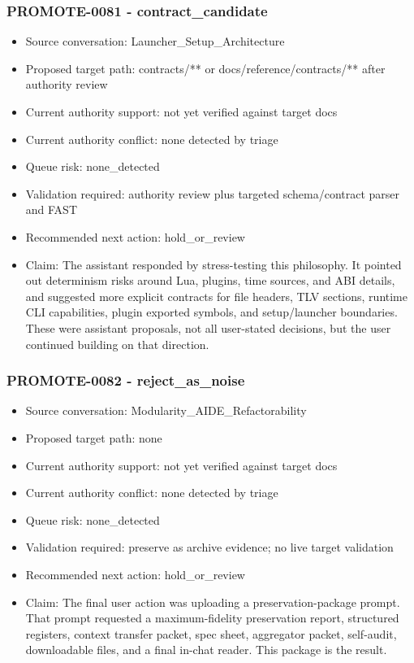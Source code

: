 \documentclass[11pt,a4paper]{report}
\begin{document}
\subsubsection{PROMOTE-0081 - contract\_candidate}

\begin{itemize}
\item Source conversation: Launcher\_Setup\_Architecture
\item Proposed target path: contracts/** or docs/reference/contracts/** after authority review
\item Current authority support: not yet verified against target docs
\item Current authority conflict: none detected by triage
\item Queue risk: none\_detected
\item Validation required: authority review plus targeted schema/contract parser and FAST
\item Recommended next action: hold\_or\_review
\item Claim: The assistant responded by stress-testing this philosophy. It pointed out determinism risks around Lua, plugins, time sources, and ABI details, and suggested more explicit contracts for file headers, TLV sections, runtime CLI capabilities, plugin exported symbols, and setup/launcher boundaries. These were assistant proposals, not all user-stated decisions, but the user continued building on that direction.
\end{itemize}

\subsubsection{PROMOTE-0082 - reject\_as\_noise}

\begin{itemize}
\item Source conversation: Modularity\_AIDE\_Refactorability
\item Proposed target path: none
\item Current authority support: not yet verified against target docs
\item Current authority conflict: none detected by triage
\item Queue risk: none\_detected
\item Validation required: preserve as archive evidence; no live target validation
\item Recommended next action: hold\_or\_review
\item Claim: The final user action was uploading a preservation-package prompt. That prompt requested a maximum-fidelity preservation report, structured registers, context transfer packet, spec sheet, aggregator packet, self-audit, downloadable files, and a final in-chat reader. This package is the result.
\end{itemize}
\end{document}
